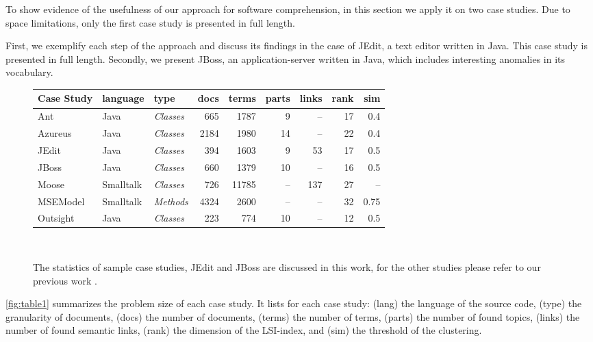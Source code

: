 \documentclass[10pt]{book}
\begin{document}
To show evidence of the usefulness of our approach for software comprehension, in this section we apply it on two case studies. Due to space limitations, only the first case study is presented in full length.

First, we exemplify each step of the approach and discuss its findings in the case of JEdit, a text editor written in Java. This case study is presented in full length. Secondly, we present JBoss, an application-server written in Java, which includes interesting anomalies in its vocabulary.

\begin{figure}[h]
\centering
{\scriptsize
\begin{tabular}{l|llrrrrrr}
\hline
\textbf{Case Study}&\textbf{language}&\textbf{type}&\textbf{docs}&\textbf{terms}
&\textbf{parts}&\textbf{links}&\textbf{rank}&\textbf{sim}\\
\hline
Ant & Java & \emph{Classes} & 665 & 1787 & 9 & -- & 17 & 0.4\\
Azureus & Java & \emph{Classes}       & 2184 & 1980 & 14 & -- & 22 & 0.4\\
JEdit & Java & \emph{Classes}       & 394  & 1603 & 9 & 53 &17 & 0.5\\
JBoss & Java & \emph{Classes}       & 660 & 1379 & 10 & -- & 16 & 0.5\\
Moose\footnotemark{} & Smalltalk & \emph{Classes}  & 726  & 11785 & -- & 137& 27 & --\\
MSEModel & Smalltalk & \emph{Methods}  & 4324  & 2600 & -- & -- & 32 & 0.75\\
Outsight & Java & \emph{Classes}    & 223 & 774 & 10 & -- & 12 & 0.5\\
\hline
\end{tabular}}\\
\caption{The statistics of sample case studies, JEdit and JBoss are discussed in this work, for the other studies please refer to our previous work \cite{Kuhn05a,Kuhn06a}.}\label{fig:table1}
\end{figure}

\autoref{fig:table1} summarizes the problem size of each case study. It lists for each case study: (lang) the language of the source code, (type) the granularity of  documents, (docs) the number of documents, (terms) the number of terms, (parts) the number of found topics, (links) the number of found semantic links, (rank) the dimension of the LSI-index, and (sim) the threshold  of the clustering.
\end{document}
